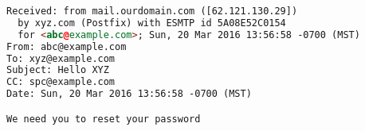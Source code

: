 \begin{lstlisting}[language=HTML,caption={SMTP headers generated by a PHP mailing
  script.},label={code:smtpheaders}, float]
Received: from mail.ourdomain.com ([62.121.130.29])
  by xyz.com (Postfix) with ESMTP id 5A08E52C0154
  for <abc@example.com>; Sun, 20 Mar 2016 13:56:58 -0700 (MST)
From: abc@example.com
To: xyz@example.com
Subject: Hello XYZ
CC: spc@example.com
Date: Sun, 20 Mar 2016 13:56:58 -0700 (MST)

We need you to reset your password
\end{lstlisting}
